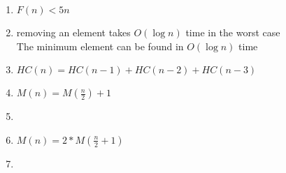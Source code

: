 \documentclass[11pt]{article}
\begin{document}
\begin{enumerate}
    \item $F(n) < 5n$
    \item 
    removing an element takes $O(\log{n})$ time in the worst case\\
    The minimum element can be found in $O(\log{n})$ time
    \item $HC(n) = HC(n-1) + HC(n-2) + HC(n-3)$
    \item $M(n) = M(\frac{n}{2}) + 1$
    \item
    \item $M(n) = 2 * M(\frac{n}{2} + 1)$
    \item 
\end{enumerate}
\end{document}
